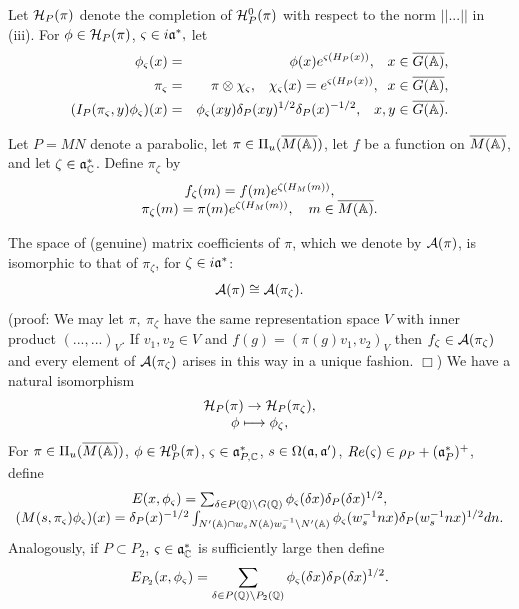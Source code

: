 Let ${\cal H}_P(\pi )$ denote the completion of ${\cal H}_P^0(\pi )$ with
respect to the norm $||...||$ in (iii). For
$\phi \in {\cal H}_P(\pi )$, $\varsigma \in i{\frak{a}}^{*},$ let
\begin{eqnarray*}
\phi _\varsigma (x)
&=&\phi (x)e^{\varsigma (H_P(x))},\;\;\;x\in \overline{G({\Bbb{A}})},
\\
\pi _\varsigma  &=&\pi \otimes \chi _\varsigma ,\;\;\;\chi _\varsigma
(x)=e^{\varsigma (H_P(x))},\;\;x\in \overline{G({\Bbb{A}})}, \\
(I_P(\pi _\varsigma ,y)\phi _\varsigma )(x) &=&\phi _\varsigma (xy)\delta
_P(xy)^{1/2}\delta _P(x)^{-1/2},\;\;\;x,y\in \overline{G({\Bbb{A}})}.
\end{eqnarray*}

Let $P=MN$ denote a parabolic, let $\pi \in \Pi _u(\overline{M({\Bbb{A}})})$,
let $f$ be a function on $\overline{M({\Bbb{A}})}$,
and let $\zeta\in {\frak{a}}^*_{\Bbb{C}}$. Define $\pi_\zeta$ by
\begin{equation}
\begin{array}{c}
f_\zeta (m)=f(m)e^{\zeta(H_M(m))},\\
\pi_\zeta(m)=\pi(m)e^{\zeta(H_M(m))},\ \ \ m\in \overline{M({\Bbb{A}})}.
\end{array}
\end{equation}

The space of (genuine) matrix coefficients of $\pi$, which we denote by
${\cal A}(\pi)$, is isomorphic to that of $\pi_\zeta$, for
$\zeta\in i{\frak{a}}^*$:
$$
{\cal A}(\pi)\cong {\cal A}(\pi_\zeta).
$$
(proof: We may let $\pi,\ \pi_\zeta$ have the same representation space
$V$ with inner product $(...,...)_V$. If $v_1,v_2\in V$ and
$f(g)=(\pi(g)v_1,v_2)_V$ then $f_\zeta\in {\cal A}(\pi_\zeta)$ and every
element of ${\cal A}(\pi_\zeta)$ arises in this way in a unique
fashion. $\Box$) We have a natural isomorphism
$$
\begin{array}{c}
{\cal H}_P(\pi)\rightarrow {\cal H}_P(\pi_\zeta),\\
\phi\longmapsto \phi_\zeta,
\end{array}
$$
For $\pi \in \Pi _u(\overline{M({\Bbb{A}})})$,
$\phi \in {\cal H}_P^0(\pi )$,
$\varsigma \in {\frak{a}}_{P,{\Bbb C}}^{*}$,
$s\in \Omega ({\frak{a}},{\frak{a}}^{\prime})$,
$Re(\varsigma )\in \rho _P+({\frak{a}}_P^{*})^{+}$, define
\begin{equation}
\begin{array}{c}
E(x,\phi _\varsigma )
=\sum_{\delta \in P({\Bbb{Q}})\backslash G({\Bbb{Q}})}
\phi _\varsigma (\delta x)\delta _P(\delta x)^{1/2}, \\
(M(s,\pi _\varsigma )\phi _\varsigma )(x)
=\delta_P(x)^{-1/2}
\int_{N^{\prime }({\Bbb{A}})\cap w_sN({\Bbb{A}})w_s^{-1}\backslash
N^{\prime }({\Bbb{A}})}
\phi _\varsigma (w_s^{-1}nx)\delta_P(w_s^{-1}nx)^{1/2}dn.
\end{array}
\end{equation}
Analogously, if $P\subset P_2$, $\varsigma \in {\frak{a}}_{{\Bbb C}}^{*}$ is
sufficiently large then define
\[
E_{P_2}(x,\phi _\varsigma )
=\sum_{\delta \in P({\Bbb{Q}})\backslash P_2({\Bbb{Q}})}
\phi _\varsigma (\delta x)\delta _P(\delta x)^{1/2}.
\]

